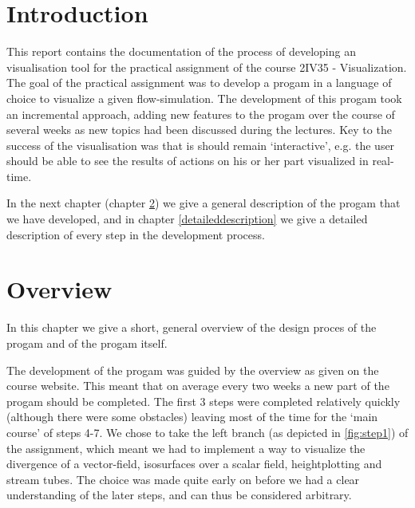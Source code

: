 \documentclass[a4paper,11pt,twoside]{report}
\begin{document}
\newcommand{\coursename}{Visualization (2IV35)}
\newcommand{\doctitle}{Practical assignment }
\newcommand{\docversion}{0.1}
\newcommand{\docdate}{\today}

\newcommand{\imagescalefactor}{0.40}
\newcommand{\cref}[1]{chapter \ref{#1}}
\newcommand{\TODO}[1]{\textsc{\textbf{TODO: #1}}}

\dotsspreamble

\tableofcontents

\dotssdocument

\chapter{Introduction}
	This report contains the documentation of the process of developing an visualisation tool for the practical assignment of the course 2IV35 - Visualization. The goal of the practical assignment was to develop a progam in a language of choice to visualize a given flow-simulation. The development of this progam took an incremental approach, adding new features to the progam over the course of several weeks as new topics had been discussed during the lectures. Key to the success of the visualisation was that is should remain `interactive', e.g. the user should be able to see the results of actions on his or her part visualized in real-time.

	In the next chapter (\cref{overview}) we give a general description of the progam that we have developed, and in \cref{detaileddescription} we give a detailed description of every step in the development process.

\chapter{Overview}\label{overview}
	In this chapter we give a short, general overview of the design proces of the progam and of the progam itself.

	The development of the progam was guided by the overview as given on the course website. This meant that on average every two weeks a new part of the progam should be completed. The first 3 steps were completed relatively quickly (although there were some obstacles) leaving most of the time for the `main course' of steps 4-7. We chose to take the left branch (as depicted in \ref{fig:step1}) of the assignment, which meant we had to implement a way to visualize the divergence of a vector-field, isosurfaces over a scalar field, heightplotting and stream tubes. The choice was made quite early on before we had a clear understanding of the later steps, and can thus be considered arbitrary.
\end{document}
